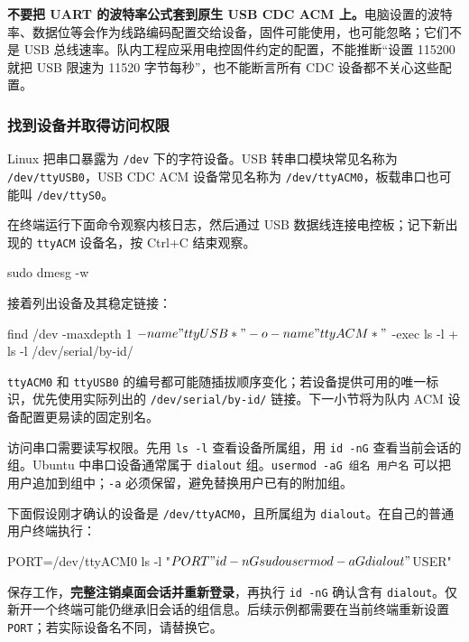 \begin{note}
\textbf{不要把 UART 的波特率公式套到原生 USB CDC ACM 上。}电脑设置的波特率、数据位等会作为线路编码配置交给设备，固件可能使用，也可能忽略；它们不是 USB 总线速率。队内工程应采用电控固件约定的配置，不能推断“设置 115200 就把 USB 限速为 11520 字节每秒”，也不能断言所有 CDC 设备都不关心这些配置。
\end{note}

\subsubsection{找到设备并取得访问权限}

Linux 把串口暴露为 \texttt{/dev} 下的字符设备。USB 转串口模块常见名称为 \texttt{/dev/ttyUSB0}，USB CDC ACM 设备常见名称为 \texttt{/dev/ttyACM0}，板载串口也可能叫 \texttt{/dev/ttyS0}。

\begin{example}[通过插拔确认设备]
在终端运行下面命令观察内核日志，然后通过 USB 数据线连接电控板；记下新出现的 \texttt{ttyACM} 设备名，按 Ctrl+C 结束观察。


\begin{tbash}
sudo dmesg -w
\end{tbash}


接着列出设备及其稳定链接：


\begin{tbash}
find /dev -maxdepth 1 \( -name "ttyUSB*" -o -name "ttyACM*" \) -exec ls -l {} +
ls -l /dev/serial/by-id/
\end{tbash}


\texttt{ttyACM0} 和 \texttt{ttyUSB0} 的编号都可能随插拔顺序变化；若设备提供可用的唯一标识，优先使用实际列出的 \texttt{/dev/serial/by-id/} 链接。下一小节将为队内 ACM 设备配置更易读的固定别名。
\end{example}

访问串口需要读写权限。先用 \texttt{ls -l} 查看设备所属组，用 \texttt{id -nG} 查看当前会话的组。Ubuntu 中串口设备通常属于 \texttt{dialout} 组。\texttt{usermod -aG 组名 用户名} 可以把用户追加到组中；\texttt{-a} 必须保留，避免替换用户已有的附加组。

\begin{example}[为普通用户配置串口权限]
下面假设刚才确认的设备是 \texttt{/dev/ttyACM0}，且所属组为 \texttt{dialout}。在自己的普通用户终端执行：


\begin{tbash}
PORT=/dev/ttyACM0
ls -l "$PORT"
id -nG
sudo usermod -aG dialout "$USER"
\end{tbash}


保存工作，\textbf{完整注销桌面会话并重新登录}，再执行 \texttt{id -nG} 确认含有 \texttt{dialout}。仅新开一个终端可能仍继承旧会话的组信息。后续示例都需要在当前终端重新设置 \texttt{PORT}；若实际设备名不同，请替换它。
\end{example}

